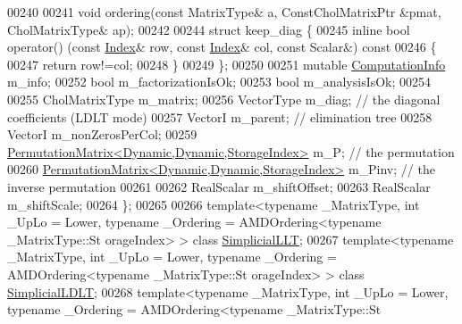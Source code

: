 \begin{DoxyCode}
00240     
00241     \textcolor{keywordtype}{void} ordering(\textcolor{keyword}{const} MatrixType& a, ConstCholMatrixPtr &pmat, CholMatrixType& ap);
00242 
00244     \textcolor{keyword}{struct }keep\_diag \{
00245       \textcolor{keyword}{inline} \textcolor{keywordtype}{bool} operator() (\textcolor{keyword}{const} \hyperlink{namespace_eigen_a62e77e0933482dafde8fe197d9a2cfde}{Index}& row, \textcolor{keyword}{const} \hyperlink{namespace_eigen_a62e77e0933482dafde8fe197d9a2cfde}{Index}& col, \textcolor{keyword}{const} Scalar&)\textcolor{keyword}{ const}
00246 \textcolor{keyword}{      }\{
00247         \textcolor{keywordflow}{return} row!=col;
00248       \}
00249     \};
00250 
00251     \textcolor{keyword}{mutable} \hyperlink{group__enums_ga85fad7b87587764e5cf6b513a9e0ee5e}{ComputationInfo} m\_info;
00252     \textcolor{keywordtype}{bool} m\_factorizationIsOk;
00253     \textcolor{keywordtype}{bool} m\_analysisIsOk;
00254     
00255     CholMatrixType m\_matrix;
00256     VectorType m\_diag;                                \textcolor{comment}{// the diagonal coefficients (LDLT mode)}
00257     VectorI m\_parent;                                 \textcolor{comment}{// elimination tree}
00258     VectorI m\_nonZerosPerCol;
00259     \hyperlink{group___core___module}{PermutationMatrix<Dynamic,Dynamic,StorageIndex>} m\_P;    
       \textcolor{comment}{// the permutation}
00260     \hyperlink{group___core___module}{PermutationMatrix<Dynamic,Dynamic,StorageIndex>} m\_Pinv; 
       \textcolor{comment}{// the inverse permutation}
00261 
00262     RealScalar m\_shiftOffset;
00263     RealScalar m\_shiftScale;
00264 \};
00265 
00266 \textcolor{keyword}{template}<\textcolor{keyword}{typename} \_MatrixType, \textcolor{keywordtype}{int} \_UpLo = Lower, \textcolor{keyword}{typename} \_Ordering = AMDOrdering<\textcolor{keyword}{typename} \_MatrixType::St
      orageIndex> > \textcolor{keyword}{class }\hyperlink{group___sparse_cholesky___module_class_eigen_1_1_simplicial_l_l_t}{SimplicialLLT};
00267 \textcolor{keyword}{template}<\textcolor{keyword}{typename} \_MatrixType, \textcolor{keywordtype}{int} \_UpLo = Lower, \textcolor{keyword}{typename} \_Ordering = AMDOrdering<\textcolor{keyword}{typename} \_MatrixType::St
      orageIndex> > \textcolor{keyword}{class }\hyperlink{group___sparse_cholesky___module_class_eigen_1_1_simplicial_l_d_l_t}{SimplicialLDLT};
00268 \textcolor{keyword}{template}<\textcolor{keyword}{typename} \_MatrixType, \textcolor{keywordtype}{int} \_UpLo = Lower, \textcolor{keyword}{typename} \_Ordering = AMDOrdering<\textcolor{keyword}{typename} \_MatrixType::St

\end{DoxyCode}
